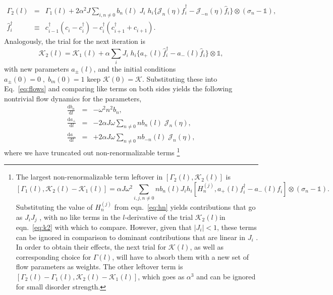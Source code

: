 \documentclass[aps,prl, notitlepage]{revtex4-1}
\begin{document}
\begin{eqnarray}
\label{eq:g2}
\Gamma_2( l) &=& \Gamma_1( l)+ {2\alpha^2 J}\sum_{i,n\neq0}   b_n(l)\; J_i\; h_i 
\bigg\{\mathcal{J}_n(\eta)\hat{f}^{\dagger}_i- \mathcal{J}_{-n}(\eta)\hat{f}^{\;}_i   \bigg\}\otimes \left(\sigma_n-\mathds{1}\right),\nonumber \\
\hat{f}^{\dagger}_i &\equiv& c^\dagger_{i-1}\left(c^{\;}_i - c^\dagger_i\right) - c^\dagger_i\left( c^\dagger_{i+1}+c^{\;}_{i+1} \right).
\end{eqnarray}
Analogously, the trial for the next iteration is
\begin{equation}
\label{eq:k2}
\mathcal{K}_2( l) = \mathcal{K}_1( l)+\alpha\sum_{i}  J_i\; h_i \bigg\{a_+(l)\hat{f}^\dagger_i -
a_-(l)\hat{f}^{\;}_i\bigg\}\otimes \mathds{1},
\end{equation}
with new parameters $a_\pm(l)$, and the initial conditions $a_\pm(0)=0\;,\;b_m(0)=1$ keep $\mathcal{K}(0)=\mathcal{K}$. Substituting these into Eq.~\ref{eq:flows} and comparing like terms on both sides yields the following nontrivial flow dynamics for the parameters, 
\begin{eqnarray}
\label{eq:rgflow}
 \frac{\mathrm{d}b_n}{\mathrm{d}l} &=& -\omega^2 n^2 b_n, \nonumber \\
 \frac{\mathrm{d}a_+}{\mathrm{d}l} &=& -2\alpha J \omega \sum_{n\neq0} n b_{n}(l)\; \mathcal{J}_n(\eta),\nonumber \\
 \frac{\mathrm{d}a_-}{\mathrm{d}l} &=& +2\alpha J \omega \sum_{n\neq0} n b_{-n}(l) \; \mathcal{J}_n(\eta),
\end{eqnarray}
where we have truncated out non-renormalizable terms 
\footnote{The largest non-renormalizable term leftover in $\left[\Gamma_2(l),\mathcal{K}_2(l)\right]$ is $$\left[\Gamma_1(l), \mathcal{K}_2(l)-\mathcal{K}_1(l) \right] =\alpha J \omega^2 \sum_{i,j,n\neq 0} n b_n(l) J_i h_i \left[H_n^{(j)},a_+(l)f^\dagger_i-a_-(l)f^{\;}_i\right] \otimes \left(\sigma_n-\mathds{1}\right).$$ Substituting the value of $H^{(j)}_n$ from eqn.~\ref{eq:hn} yields contributions that go as $J_i J_j$ , with no like terms in the $l$-derivative of the trial $\mathcal{K}_2(l)$​ ​in eqn.~\ref{eq:k2} ​with which to compare. However, given that  $|J_i|<1$, these terms can be ignored in comparison to dominant contributions that are linear in $J_i$ . In order to obtain their effects, the next trial for $\mathcal{K}(l)$, as well as corresponding choice for $\Gamma(l)$, will have to absorb them with a new set of flow parameters as weights. The other leftover term is $\left[\Gamma_2(l)-\Gamma_1(l),\mathcal{K}_2(l)-\mathcal{K}_1(l)\right]$, which goes as $\alpha^3$ and can be ignored for small 
disorder strength.}
\end{document}
